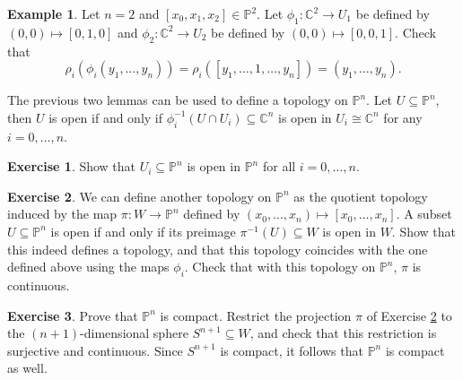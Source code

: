 \documentclass{article}
\newcommand{\C}{\mathbb{C}}
\renewcommand{\P}{\mathbb{P}}
\newcommand{\rb}[1]{\left( #1 \right)}
\renewcommand{\sb}[1]{\left[ #1 \right]}
\theoremstyle{definition}\newtheorem{definition}{Definition}[section]
\theoremstyle{definition}\newtheorem{notation}[definition]{Notation}
\theoremstyle{definition}\newtheorem{remark}[definition]{Remark}
\theoremstyle{definition}\newtheorem{example}[definition]{Example}
\theoremstyle{definition}\newtheorem{fact}{Fact}
\theoremstyle{definition}\newtheorem{exercise}{Exercise}
\begin{document}
\begin{example}
Let $ n = 2 $ and $ \sb{x_0, x_1, x_2} \in \P^2 $. Let $ \phi_1 : \C^2 \to U_1 $ be defined by $ \rb{0, 0} \mapsto \sb{0, 1, 0} $ and $ \phi_2 : \C^2 \to U_2 $ be defined by $ \rb{0, 0} \mapsto \sb{0, 0, 1} $. Check that
$$ \rho_i\rb{\phi_i\rb{y_1, \dots, y_n}} = \rho_i\rb{\sb{y_1, \dots, 1, \dots, y_n}} = \rb{y_1, \dots, y_n}. $$
\end{example}

The previous two lemmas can be used to define a topology on $ \P^n $. Let $ U \subseteq \P^n $, then $ U $ is open if and only if $ \phi_i^{-1}\rb{U \cap U_i} \subseteq \C^n $ is open in $ U_i \cong \C^n $ for any $ i = 0, \dots, n $.

\begin{exercise}
Show that $ U_i \subseteq \P^n $ is open in $ \P^n $ for all $ i = 0, \dots, n $.
\end{exercise}

\begin{exercise}
\label{ex:11}
We can define another topology on $ \P^n $ as the quotient topology induced by the map $ \pi : W \to \P^n $ defined by $ \rb{x_0, \dots, x_n} \mapsto \sb{x_0, \dots, x_n} $. A subset $ U \subseteq \P^n $ is open if and only if its preimage $ \pi^{-1}\rb{U} \subseteq W $ is open in $ W $. Show that this indeed defines a topology, and that this topology coincides with the one defined above using the maps $ \phi_i $. Check that with this topology on $ \P^n $, $ \pi $ is continuous.
\end{exercise}

\begin{exercise}
\label{ex:12}
Prove that $ \P^n $ is compact. Restrict the projection $ \pi $ of Exercise \ref{ex:11} to the $ \rb{n + 1} $-dimensional sphere $ S^{n + 1} \subseteq W $, and check that this restriction is surjective and continuous. Since $ S^{n + 1} $ is compact, it follows that $ \P^n $ is compact as well.
\end{exercise}
\end{document}
